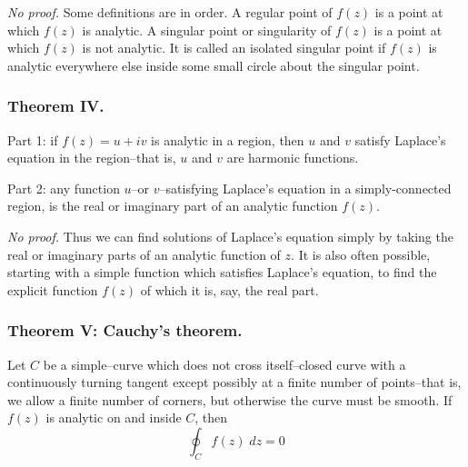 \documentclass[../main.tex]{subfiles}
\begin{document}
\emph{No proof.} Some definitions are in order. A regular point of $f (z)$ is a point at which $f (z)$ is analytic. A singular point or singularity of $f (z)$ is a point at which $f (z)$ is not analytic. It is called an isolated singular point if $f (z)$ is analytic everywhere else inside some small circle about the singular point.

\subsubsection*{Theorem IV.} Part 1: if $f(z) = u +iv$ is analytic in a region, then $u$ and $v$ satisfy Laplace's equation in the region--that is, $u$ and $v$ are harmonic functions. 

Part 2: any function $u$--or $v$--satisfying Laplace's equation in a simply-connected region, is the real or imaginary part of an analytic function $f(z)$.

\emph{No proof.} Thus we can find solutions of Laplace's equation simply by taking the real or imaginary parts of an analytic function of $z$. It is also often possible, starting with a simple function which satisfies Laplace's equation, to find the explicit function $f (z)$ of which it is, say, the real part.

\subsubsection*{Theorem V: Cauchy's theorem.} Let $C$ be a simple--curve which does not cross itself--closed curve with a continuously turning tangent except possibly at a ﬁnite number of points--that is, we allow a ﬁnite number of corners, but otherwise the curve must be smooth. If $f(z)$ is analytic on and inside $C$, then
\begin{equation*}
    \oint_C f(z) \;dz = 0
\end{equation*}
\end{document}
